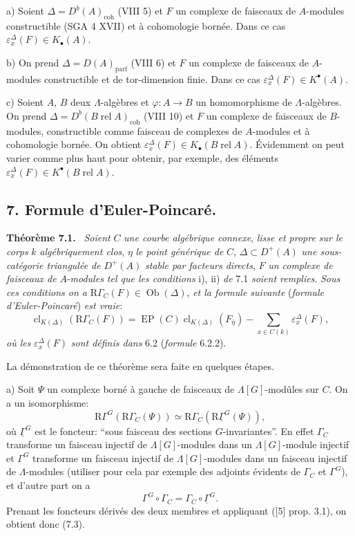 \documentclass[11pt]{article}
\newenvironment{statement}[1]{\par\medskip\noindent\textbf{#1.}\ }{\par\medskip}
\providecommand{\EP}{\operatorname{EP}}
\providecommand{\parf}{\mathrm{parf}}
\providecommand{\coh}{\mathrm{coh}}
\providecommand{\EP}{\operatorname{EP}}
\providecommand{\parf}{\mathrm{parf}}
\providecommand{\coh}{\mathrm{coh}}
\providecommand{\clK}[1]{\operatorname{cl}_{K(#1)}}
\begin{document}
a) Soient $\Delta=D^b(A)_{\coh}$ (VIII 5) et $F$ un complexe de faisceaux de $A$-modules constructible (SGA 4 XVII) et à cohomologie bornée. Dans ce cas $\varepsilon_x^\Delta(F)\in K_\bullet(A)$.

b) On prend $\Delta=D(A)_{\parf}$ (VIII 6) et $F$ un complexe de faisceaux de $A$-modules constructible et de tor-dimension finie. Dans ce cas $\varepsilon_x^\Delta(F)\in K^{\bullet}(A)$.

c) Soient $A$, $B$ deux $\Lambda$-algèbres et $\varphi:A\to B$ un homomorphisme de $\Lambda$-algèbres. On prend $\Delta=D^b(B\operatorname{ rel }A)_{\coh}$ (VIII 10) et $F$ un complexe de faisceaux de $B$-modules, constructible comme faisceau de complexes de $A$-modules et à cohomologie bornée. On obtient $\varepsilon_x^\Delta(F)\in K_\bullet(B\operatorname{ rel }A)$. Évidemment on peut varier comme plus haut pour obtenir, par exemple, des éléments $\varepsilon_x^\Delta(F)\in K^{\bullet}(B\operatorname{ rel }A)$.

\subsection*{7. Formule d'Euler-Poincaré.}

\begin{statement}{Théorème 7.1}
\emph{Soient} $C$ \emph{une courbe algébrique connexe}, \emph{lisse et propre sur le corps} $k$ \emph{algébriquement clos}, $\eta$ \emph{le point générique de} $C$, $\Delta\subset D^+(A)$ \emph{une sous-catégorie triangulée de} $D^+(A)$ \emph{stable par facteurs directs}, $F$ \emph{un complexe de faisceaux de} $A$-\emph{modules tel que les conditions} i), ii) \emph{de} 7.1 \emph{soient remplies}. \emph{Sous ces conditions on a} $\mathrm{R}\Gamma_C(F)\in\operatorname{Ob}(\Delta)$, \emph{et la formule suivante} (\emph{formule d'Euler-Poincaré}) \emph{est vraie}:
\[
\clK{\Delta}(\mathrm{R}\Gamma_C(F))
=
\EP(C)\clK{\Delta}(F_{\bar\eta})
-\sum_{x\in C(k)}\varepsilon_x^\Delta(F),
\tag{7.2}
\]
\emph{où les} $\varepsilon_x^\Delta(F)$ \emph{sont définis dans} 6.2 (\emph{formule} 6.2.2).
\end{statement}

La
démonstration de ce théorème sera faite en quelques étapes.

a) Soit $\Psi$ un complexe borné à gauche de faisceaux de $\Lambda[G]$-modûles sur $C$. On a un isomorphisme:
\[
\mathrm{R}\Gamma^G(\mathrm{R}\Gamma_C(\Psi))\simeq\mathrm{R}\Gamma_C(\mathrm{R}\underline{\Gamma}^G(\Psi)),
\tag{7.3}
\]
où $\underline{\Gamma}^G$ est le foncteur: ``sous faisceau des sections $G$-invariantes''. En effet $\Gamma_C$ transforme un faisceau injectif de $\Lambda[G]$-modules dans un $\Lambda[G]$-module injectif et $\Gamma^G$ transforme un faisceau injectif de $\Lambda[G]$-modules dans un faisceau injectif de $\Lambda$-modules (utiliser pour cela par exemple des adjoints évidents de $\Gamma_C$ et $\Gamma^G$), et d'autre part on a
\[
\Gamma^G\circ\Gamma_C=\Gamma_C\circ\underline{\Gamma}^G.
\]
Prenant les foncteurs dérivés des deux membres et appliquant ([5] prop. 3.1), on obtient donc (7.3).
\end{document}

